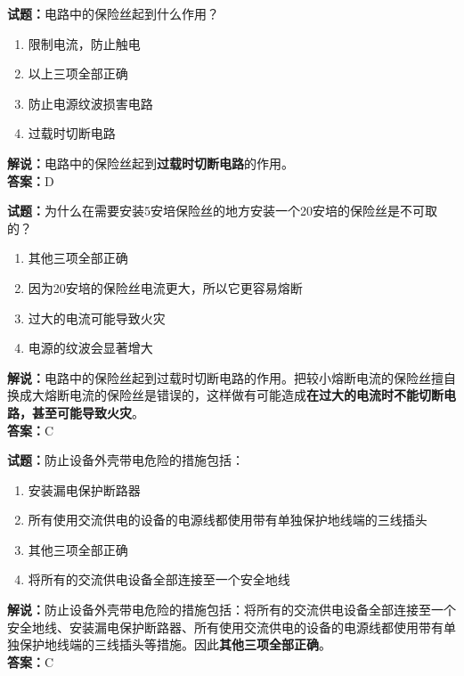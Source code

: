 \documentclass{ctexbook}
\begin{document}
\vspace{\baselineskip}

\noindent\textbf{试题：}电路中的保险丝起到什么作用？
\begin{enumerate}[leftmargin=3em]
  \item 限制电流，防止触电
  \item 以上三项全部正确
  \item 防止电源纹波损害电路
  \item 过载时切断电路
\end{enumerate}
\noindent\textbf{解说：}电路中的保险丝起到\textbf{过载时切断电路}的作用。\\\noindent\textbf{答案：}D
\vspace{\baselineskip}

\noindent\textbf{试题：}为什么在需要安装5安培保险丝的地方安装一个20安培的保险丝是不可取的？
\begin{enumerate}[leftmargin=3em]
  \item 其他三项全部正确
  \item 因为20安培的保险丝电流更大，所以它更容易熔断
  \item 过大的电流可能导致火灾
  \item 电源的纹波会显著增大
\end{enumerate}
\noindent\textbf{解说：}电路中的保险丝起到过载时切断电路的作用。把较小熔断电流的保险丝擅自换成大熔断电流的保险丝是错误的，这样做有可能造成\textbf{在过大的电流时不能切断电路，甚至可能导致火灾}。\\\noindent\textbf{答案：}C%

\vspace{\baselineskip}

\noindent\textbf{试题：}防止设备外壳带电危险的措施包括：
\begin{enumerate}[leftmargin=3em]
  \item 安装漏电保护断路器
  \item 所有使用交流供电的设备的电源线都使用带有单独保护地线端的三线插头
  \item 其他三项全部正确
  \item 将所有的交流供电设备全部连接至一个安全地线
\end{enumerate}
\noindent\textbf{解说：}防止设备外壳带电危险的措施包括：将所有的交流供电设备全部连接至一个安全地线、安装漏电保护断路器、所有使用交流供电的设备的电源线都使用带有单独保护地线端的三线插头等措施。因此\textbf{其他三项全部正确}。\\\noindent\textbf{答案：}C

\vspace{\baselineskip}
\end{document}
